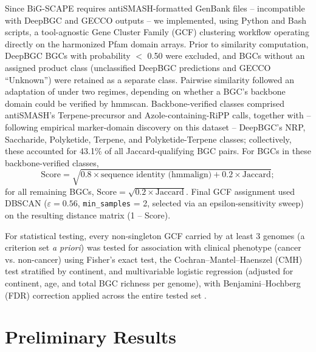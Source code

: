 \documentclass[12pt]{article}
\begin{document}
Since BiG-SCAPE requires antiSMASH-formatted GenBank files -- incompatible with DeepBGC and GECCO outputs -- we implemented, using Python and Bash scripts, a tool-agnostic Gene Cluster Family (GCF) clustering workflow operating directly on the harmonized Pfam domain arrays. Prior to similarity computation, DeepBGC BGCs with probability $<$ 0.50 were excluded, and BGCs without an assigned product class (unclassified DeepBGC predictions and GECCO ``Unknown'') were retained as a separate class. Pairwise similarity followed an adaptation of \cite{robey2021} under two regimes, depending on whether a BGC's backbone domain could be verified by hmmscan. Backbone-verified classes comprised antiSMASH's Terpene-precursor and Azole-containing-RiPP calls, together with -- following empirical marker-domain discovery on this dataset -- DeepBGC's NRP, Saccharide, Polyketide, Terpene, and Polyketide-Terpene classes; collectively, these accounted for 43.1\% of all Jaccard-qualifying BGC pairs. For BGCs in these backbone-verified classes,
$$\text{Score} = \sqrt{0.8 \times \text{sequence identity (hmmalign)} + 0.2 \times \text{Jaccard}};$$
for all remaining BGCs, $\text{Score} = \sqrt{0.2 \times \text{Jaccard}}$. Final GCF assignment used DBSCAN ($\varepsilon = 0.56$, \texttt{min\_samples} = 2, selected via an epsilon-sensitivity sweep) on the resulting distance matrix (1 -- Score).

For statistical testing, every non-singleton GCF carried by at least 3 genomes (a criterion set \textit{a priori}) was tested for association with clinical phenotype (cancer vs. non-cancer) using Fisher's exact test, the Cochran--Mantel--Haenszel (CMH) test stratified by continent, and multivariable logistic regression (adjusted for continent, age, and total BGC richness per genome), with Benjamini--Hochberg (FDR) correction applied across the entire tested set \cite{benjaminihochberg1995}.

\section{Preliminary Results}
\end{document}
